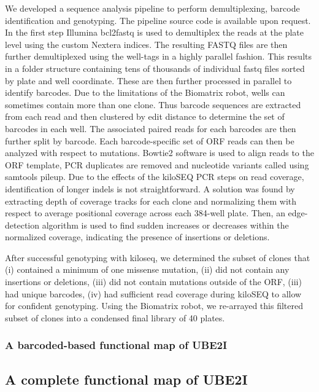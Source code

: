 We developed a sequence analysis pipeline to perform demultiplexing, barcode identification and genotyping. The pipeline source code is available upon request. In the first step Illumina bcl2fastq is used to demultiplex the reads at the plate level using the custom Nextera indices. The resulting FASTQ files are then further demultiplexed using the well-tags in a highly parallel fashion. This results in a folder structure containing tens of thousands of individual fastq files sorted by plate and well coordinate. These are then further processed in parallel to identify barcodes. Due to the limitations of the Biomatrix robot, wells can sometimes contain more than one clone. Thus barcode sequences are extracted from each read and then clustered by edit distance to determine the set of barcodes in each well. The associated paired reads for each barcodes are then further split by barcode. Each barcode-specific set of ORF reads can then be analyzed with respect to mutations. Bowtie2 software is used to align reads to the ORF template, PCR duplicates are removed and nucleotide variants called using samtools pileup. Due to the effects of the kiloSEQ PCR steps on read coverage, identification of longer indels is not straightforward. A solution was found by extracting depth of coverage tracks for each clone and normalizing them with respect to average positional coverage across each 384-well plate. Then, an edge-detection algorithm is used to find sudden increases or decreases within the normalized coverage, indicating the presence of insertions or deletions.

After successful genotyping with kiloseq, we determined the subset of clones that (i) contained a minimum of one missense mutation, (ii) did not contain any insertions or deletions, (iii) did not contain mutations outside of the ORF, (iii) had unique barcodes, (iv) had sufficient read coverage during kiloSEQ to allow for confident genotyping. Using the Biomatrix robot, we re-arrayed this filtered subset of clones into a condensed final library of 40 plates.

\subsubsection{A barcoded-based functional map of UBE2I}

\subsection{A complete functional map of UBE2I}


